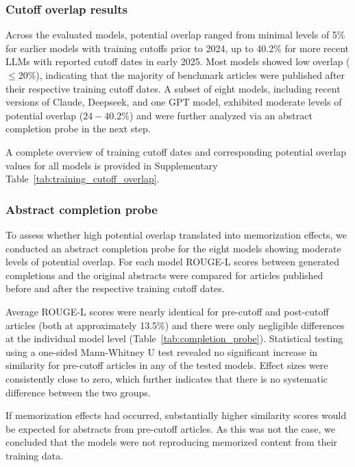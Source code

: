 \subsubsection{Cutoff overlap results}

Across the evaluated models, potential overlap ranged from minimal levels of 5\% for earlier models with training cutoffs prior to 2024, up to 40.2\% for more recent \acp{LLM} with reported cutoff dates in early 2025. Most models showed low overlap ($\leq 20\%$), indicating that the majority of benchmark articles were published after their respective training cutoff dates. A subset of eight models, including recent versions of Claude, Deepseek, and one \ac{GPT} model, exhibited moderate levels of potential overlap ($24 - 40.2\%$) and were further analyzed via an abstract completion probe in the next step.

A complete overview of training cutoff dates and corresponding potential overlap values for all models is provided in Supplementary Table~\ref{tab:training_cutoff_overlap}.

\subsubsection{Abstract completion probe}

To assess whether high potential overlap translated into memorization effects, we conducted an abstract completion probe for the eight models showing moderate levels of potential overlap. For each model \ac{ROUGE}-L scores between generated completions and the original abstracts were compared for articles published before and after the respective training cutoff dates.

Average \ac{ROUGE}-L scores were nearly identical for pre-cutoff and post-cutoff articles (both at approximately 13.5\%) and there were only negligible differences at the individual model level (Table~\ref{tab:completion_probe}). Statistical testing using a one-sided Mann-Whitney U test revealed no significant increase in similarity for pre-cutoff articles in any of the tested models. Effect sizes were consistently close to zero, which further indicates that there is no systematic difference between the two groups.

If memorization effects had occurred, substantially higher similarity scores would be expected for abstracts from pre-cutoff articles. As this was not the case, we concluded that the models were not reproducing memorized content from their training data.

